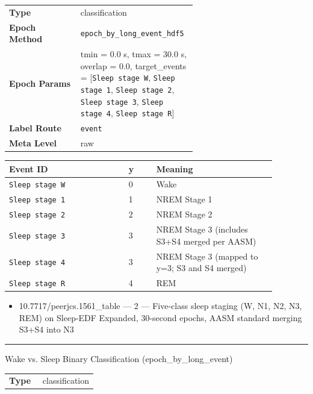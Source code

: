 {\begin{tcolorbox}
{\begin{tabular}{@{}lp{0.62\linewidth}@{}}
\textbf{Type} & classification \\
\textbf{Epoch Method} & \texttt{epoch\_by\_long\_event\_hdf5} \\
\textbf{Epoch Params} & tmin = 0.0 s, tmax = 30.0 s, overlap = 0.0, target\_events = [\texttt{Sleep stage W}, \texttt{Sleep stage 1}, \texttt{Sleep stage 2}, \texttt{Sleep stage 3}, \texttt{Sleep stage 4}, \texttt{Sleep stage R}] \\
\textbf{Label Route} & \texttt{event} \\
\textbf{Meta Level} & raw \\
\end{tabular}}
\par{}\par\smallskip
\begingroup\footnotesize
\begin{tabular}{@{}p{0.3911\linewidth}p{0.0978\linewidth}p{0.3911\linewidth}@{}}
\toprule
\textbf{Event ID} & \textbf{y} & \textbf{Meaning} \\
\midrule
\texttt{Sleep stage W} & 0 & Wake \\
\texttt{Sleep stage 1} & 1 & NREM Stage 1 \\
\texttt{Sleep stage 2} & 2 & NREM Stage 2 \\
\texttt{Sleep stage 3} & 3 & NREM Stage 3 (includes S3+S4 merged per AASM) \\
\texttt{Sleep stage 4} & 3 & NREM Stage 3 (mapped to y=3; S3 and S4 merged) \\
\texttt{Sleep stage R} & 4 & REM \\
\bottomrule
\end{tabular}
\endgroup
\par{}\par
\begin{itemize}[leftmargin=1.3em,noitemsep,topsep=1pt]
\item[\scriptsize$\cdot$] {\scriptsize 10.7717/peerjcs.1561\_table --- 2 --- Five-class sleep staging (W, N1, N2, N3, REM) on Sleep-EDF Expanded, 30-second epochs, AASM standard merging S3+S4 into N3}
\end{itemize}
\noindent\rule{\linewidth}{0.4pt}\par\nopagebreak
{} {\footnotesize Wake vs. Sleep Binary Classification (epoch\_by\_long\_event)}\par\smallskip
{\footnotesize\begin{tabular}{@{}lp{0.62\linewidth}@{}}
\textbf{Type} & classification \\

\end{tabular}}
\end{tcolorbox}}
